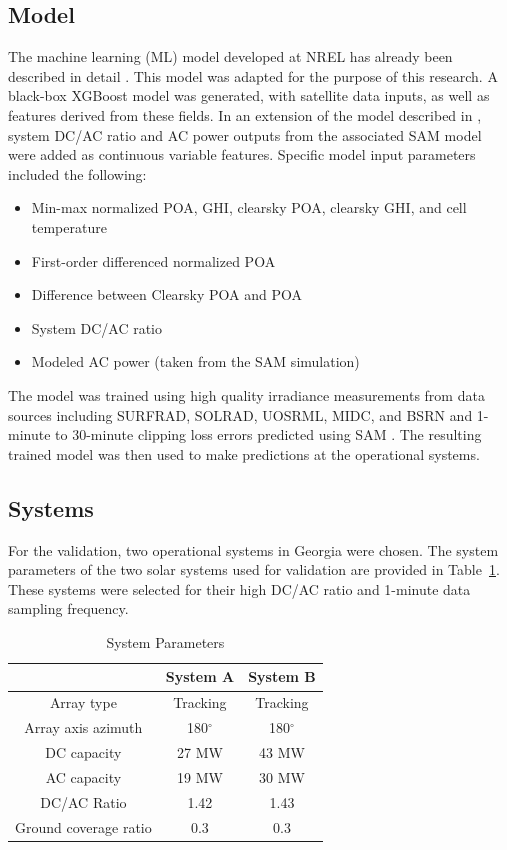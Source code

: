 \documentclass[conference]{IEEEtran}
\begin{document}
\subsection{Model}

The machine learning (ML) model developed at NREL has already been described in detail \cite{Anderson2020}. This model was adapted for the purpose of this research. A black-box XGBoost model was generated, with satellite data inputs, as well as features derived from these fields. In an extension of the model described in \cite{Anderson2020}, system DC/AC ratio and AC power outputs from the associated SAM model were added as continuous variable features. Specific model input parameters included the following:
\begin{itemize}
\item Min-max normalized POA, GHI, clearsky POA, clearsky GHI, and cell temperature
\item First-order differenced normalized POA
\item Difference between Clearsky POA and POA
\item System DC/AC ratio
\item Modeled AC power (taken from the SAM simulation) 
\end{itemize}
The model was trained using high quality irradiance measurements from data sources including SURFRAD, SOLRAD, UOSRML, MIDC, and BSRN \cite{Augustine2000} \cite{solrad} and 1-minute to 30-minute clipping loss errors predicted using SAM \cite{Freeman2018}. The resulting trained model was then used to make predictions at the operational systems.

\subsection{Systems}

For the validation, two operational systems in Georgia were chosen. The system parameters of the two solar systems used for validation are provided in Table~\ref{table1}. These systems were selected for their high DC/AC ratio and 1-minute data sampling frequency.

\begin{table}[htbp]
\caption{System Parameters}
\begin{center}
\begin{tabular}{ |c|c|c| } 
\hline
& System A & System B \\
\hline
Array type & Tracking & Tracking \\
\hline
Array axis azimuth & 180$^{\circ}$ & 180$^{\circ}$\\
\hline
DC capacity & 27 MW & 43 MW\\
\hline
AC capacity & 19 MW & 30 MW \\
\hline
DC/AC Ratio & 1.42 & 1.43 \\
\hline
Ground coverage ratio & 0.3 & 0.3 \\
\hline
\end{tabular}
\end{center}
\label{table1}
\end{table}
\end{document}
